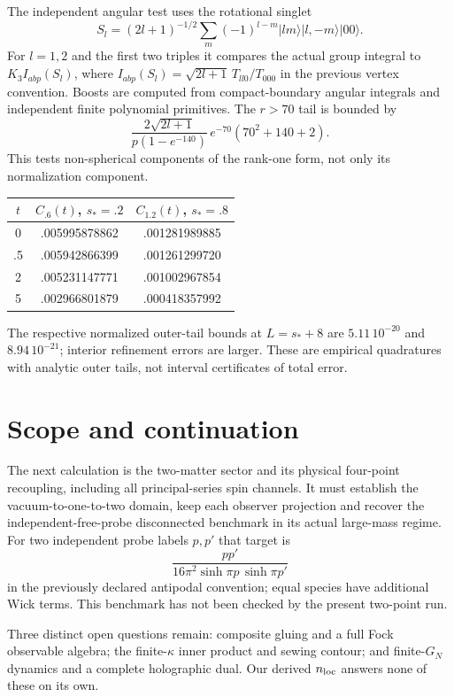 \documentclass[11pt,a4paper]{article}
\begin{document}
The independent angular test uses the rotational singlet
\[
 S_l=(2l+1)^{-1/2}\sum_m(-1)^{l-m}|lm\rangle|l,-m\rangle|00\rangle .
\]
For $l=1,2$ and the first two triples it compares the actual group
integral to $K_3 I_{abp}(S_l)$, where
$I_{abp}(S_l)=\sqrt{2l+1}\,T_{ll0}/T_{000}$ in the previous vertex convention.
Boosts are computed from compact-boundary angular integrals and
independent finite polynomial primitives. The $r>70$ tail is bounded by
\[
 \frac{2\sqrt{2l+1}}{p(1-e^{-140})}\,e^{-70}(70^2+140+2).
\]
This tests non-spherical components of the rank-one form, not only its
normalization component.

\begin{center}
\begin{tabular}{ccc}
\toprule
$t$ & $C_{.6}(t)$, $s_*=.2$ & $C_{1.2}(t)$, $s_*=.8$\\ \midrule
0   & .005995878862 & .001281989885\\
.5  & .005942866399 & .001261299720\\
2   & .005231147771 & .001002967854\\
5   & .002966801879 & .000418357992\\ \bottomrule
\end{tabular}
\end{center}
The respective normalized outer-tail bounds at $L=s_*+8$ are
$5.11\,10^{-20}$ and $8.94\,10^{-21}$; interior refinement errors are larger.
These are empirical quadratures with analytic outer tails, not interval
certificates of total error.

\newpage
\section{Scope and continuation}
The next calculation is the two-matter sector and its physical four-point
recoupling, including all principal-series spin channels. It must establish
the vacuum-to-one-to-two domain, keep each observer projection and
recover the independent-free-probe disconnected benchmark in its actual
large-mass regime. For two independent probe labels $p,p'$ that target is
\[
 \frac{pp'}{16\pi^2\sinh\pi p\,\sinh\pi p'}
\]
in the previously declared antipodal convention; equal species have
additional Wick terms. This benchmark has not been checked by the
present two-point run.

Three distinct open questions remain: composite gluing and a full Fock
observable algebra; the finite-$\kappa$ inner product and sewing contour;
and finite-$G_N$ dynamics and a complete holographic dual.
Our derived $n_{\rm loc}$ answers none of these on its own.
\end{document}

